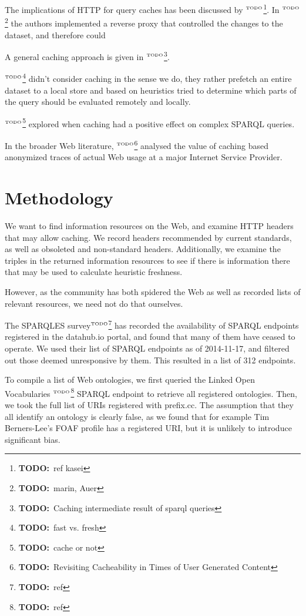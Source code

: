 \documentclass{article}
\newcommand{\todo}[1]{\ensuremath{^{\textrm{\tiny{TODO}\normalsize}}}\footnote{\textbf{TODO:}~#1}}
\begin{document}
The implications of HTTP for query caches has been discussed by
\todo{ref kasei}. In \todo{marin, Auer} the authors implemented a
reverse proxy that controlled the changes to the dataset, and
therefore could 

A general caching approach is given in \todo{Caching intermediate
  result of sparql queries}. 

\todo{fast vs. fresh} didn't consider caching in the sense we do, they
rather prefetch an entire dataset to a local store and based on
heuristics tried to determine which parts of the query should be
evaluated remotely and locally.

\todo{cache or not} explored when caching had a positive effect on
complex SPARQL queries.

In the broader Web literature, \todo{Revisiting Cacheability
in Times of User Generated Content} analysed the value of caching
based anonymized traces of actual Web usage at a major Internet
Service Provider.

\section{Methodology}

We want to find information resources on the Web, and examine HTTP
headers that may allow caching. We record headers recommended by
current standards, as well as obsoleted and non-standard
headers. Additionally, we examine the triples in the returned
information resources to see if there is information there that may be
used to calculate heuristic freshness.

However, as the community has both spidered the Web as well as
recorded lists of relevant resources, we need not do that ourselves. 

The SPARQLES survey\todo{ref} has recorded the availability of SPARQL
endpoints registered in the datahub.io portal, and found that many of
them have ceased to operate. We used their list of SPARQL endpoints as
of 2014-11-17, and filtered out those deemed unresponsive by
them. This resulted in a list of 312 endpoints.

To compile a list of Web ontologies, we first queried the Linked Open
Vocabularies \todo{ref} SPARQL endpoint to retrieve all registered
ontologies. Then, we took the full list of URIs registered with
prefix.cc. The assumption that they all identify an ontology is
clearly false, as we found that for example Tim Berners-Lee's FOAF
profile has a registered URI, but it is unlikely to introduce
significant bias.
\end{document}
